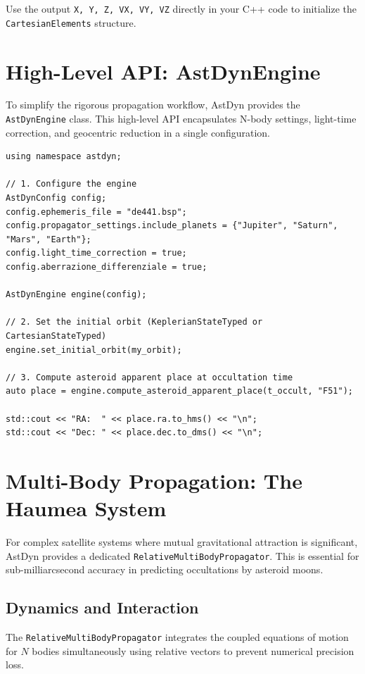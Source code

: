 Use the output \texttt{X, Y, Z, VX, VY, VZ} directly in your C++ code to initialize the \texttt{CartesianElements} structure.

\section{High-Level API: AstDynEngine}
\label{sec:high_level_api}

To simplify the rigorous propagation workflow, AstDyn provides the \texttt{AstDynEngine} class. This high-level API encapsulates N-body settings, light-time correction, and geocentric reduction in a single configuration.

\begin{lstlisting}[style=cpp, caption={Using AstDynEngine for high-precision predictions}]
using namespace astdyn;

// 1. Configure the engine
AstDynConfig config;
config.ephemeris_file = "de441.bsp";
config.propagator_settings.include_planets = {"Jupiter", "Saturn", "Mars", "Earth"};
config.light_time_correction = true;
config.aberrazione_differenziale = true;

AstDynEngine engine(config);

// 2. Set the initial orbit (KeplerianStateTyped or CartesianStateTyped)
engine.set_initial_orbit(my_orbit);

// 3. Compute asteroid apparent place at occultation time
auto place = engine.compute_asteroid_apparent_place(t_occult, "F51");

std::cout << "RA:  " << place.ra.to_hms() << "\n";
std::cout << "Dec: " << place.dec.to_dms() << "\n";
\end{lstlisting}

\section{Multi-Body Propagation: The Haumea System}
\label{sec:multi_body_propagation}

For complex satellite systems where mutual gravitational attraction is significant, AstDyn provides a dedicated \texttt{RelativeMultiBodyPropagator}. This is essential for sub-milliarcsecond accuracy in predicting occultations by asteroid moons.

\subsection{Dynamics and Interaction}

The \texttt{RelativeMultiBodyPropagator} integrates the coupled equations of motion for $N$ bodies simultaneously using relative vectors to prevent numerical precision loss.

